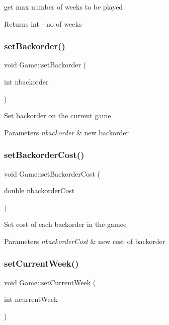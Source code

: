 get max number of weeks to be played \begin{DoxyReturn}{Returns}
int -\/ no of weeks 
\end{DoxyReturn}
\mbox{\label{classGame_a7bed0fb500fa97a8b3a30420629a4c38}} 
\subsubsection{\texorpdfstring{set\+Backorder()}{setBackorder()}}
{\footnotesize\ttfamily void Game\+::set\+Backorder (\begin{DoxyParamCaption}\item[{int}]{nbackorder }\end{DoxyParamCaption})}

Set backorder on the current game 
\begin{DoxyParams}{Parameters}
{\em nbackorder} & new backorder \\
\hline
\end{DoxyParams}
\mbox{\label{classGame_a23c5d1b710b8daa02fe623f709e1f62f}} 
\subsubsection{\texorpdfstring{set\+Backorder\+Cost()}{setBackorderCost()}}
{\footnotesize\ttfamily void Game\+::set\+Backorder\+Cost (\begin{DoxyParamCaption}\item[{double}]{nbackorder\+Cost }\end{DoxyParamCaption})}

Set cost of each backorder in the gamee 
\begin{DoxyParams}{Parameters}
{\em nbackorder\+Cost} & new cost of backorder \\
\hline
\end{DoxyParams}
\mbox{\label{classGame_a894a4b2d874a67fd25b084adc8bf1bc9}} 
\subsubsection{\texorpdfstring{set\+Current\+Week()}{setCurrentWeek()}}
{\footnotesize\ttfamily void Game\+::set\+Current\+Week (\begin{DoxyParamCaption}\item[{int}]{ncurrent\+Week }\end{DoxyParamCaption})}

